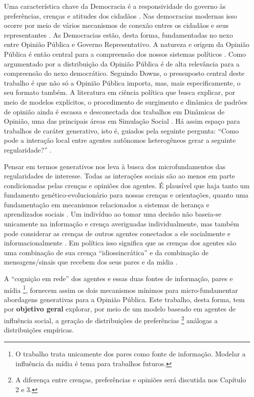 Uma característica chave da Democracia é a responsividade do governo às
preferências, crenças e atitudes dos cidadãos
\cite{dahl1973polyarchy,bartels2003democracy}. Nas democracias modernas isso
ocorre por meio de vários mecanismos de conexão entres os cidadãos e seus
representantes \cite{dahl1973polyarchy, schumpeter2013capitalism}. As
Democracias estão, desta forma, fundamentadas no nexo entre Opinião Pública e
Governo Representativo. A natureza e origem da Opinião Pública é então central
para a compreensão dos nossos sistemas políticos \cite{berelson1952democratic}.
Como argumentado por  a distribuição da Opinião
Pública é de alta relevância para a compreensão do nexo democrático. Seguindo
Downs, o pressuposto central deste trabalho é que não só a Opinião Pública
importa, mas, mais especificamente, o seu formato também. A literatura em
ciência política que busca explicar, por meio de modelos explícitos, o
procedimento de surgimento e dinâmica de padrões de opinião ainda é escassa e
desconectada dos trabalhos em Dinâmicas de Opinião, uma das principais áreas em
Simulação Social  \cite{lorenz2017modeling, laver2011party, hauke2017recent}. Há
assim espaço para trabalhos de caráter generativo, isto é, guiados pela seguinte
pergunta: ``Como pode a interação local entre agentes autônomos heterogêneos
gerar a seguinte regularidade?'' \cite{epstein2006generative}.

Pensar em termos generativos nos leva à busca dos microfundamentos das
regularidades de interesse. Todas as interações sociais são ao menos em parte
condicionadas pelas crenças e opiniões dos agentes. É plausível que haja tanto
um fundamento genético-evolucionário para nossas crenças e orientações, quanto
uma fundamentação em mecanismos relacionados a sistemas de herança e
aprendizados sociais \cite{jablonka2014evolution, fowler2008biology,
fowler2013defense}. Um indivíduo ao tomar uma decisão não baseia-se unicamente
na informação e crença averiguadas individualmente, mas também pode considerar
as crenças de outros agentes conectados a ele socialmente e informacionalmente
\cite{gintis2016individuality}. Em política isso significa que as crenças dos
agentes são uma combinação de sua crença ``idiossincrática'' e da combinação de
mensagens/sinais que recebem dos seus pares e da mídia
\cite{barabas2004deliberation,ryan2011social}.

A ``cognição em rede'' \cite{gintis2016individuality} dos agentes e essas duas
fontes de informação, pares e mídia \footnote{O trabalho trata unicamente dos
pares como fonte de informação. Modelar a influência da mídia é tema para
trabalhos futuros.}, fornecem assim os dois mecanismos mínimos para
micro-fundamentar abordagens generativas para a Opinião Pública. Este trabalho,
desta forma, tem por \textbf{objetivo geral} explorar, por meio de um modelo
baseado em agentes de influência social, a geração de distribuições de
preferências \footnote{A diferença entre crenças, preferências e opiniões será
discutida nos Capítulo 2 e 3.} análogas a distribuições empíricas.

